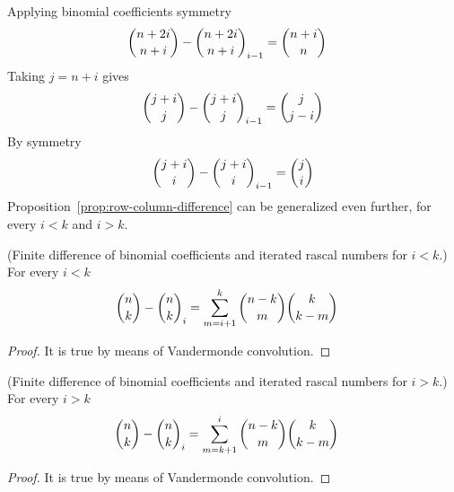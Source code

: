 Applying binomial coefficients symmetry
\begin{align*}
    \binom{n+2i}{n+i} - \binom{n+2i}{n+i}_{i-1} &= \binom{n+i}{n}
\end{align*}
Taking $j=n+i$ gives
\begin{align*}
    \binom{j+i}{j} - \binom{j+i}{j}_{i-1} = \binom{j}{j-i}
\end{align*}
By symmetry
\begin{align*}
    \binom{j+i}{i} - \binom{j+i}{i}_{i-1} = \binom{j}{i}
\end{align*}
Proposition~\eqref{prop:row-column-difference} can be generalized even further, for every $i<k$ and $i>k$.
\begin{proposition}
(Finite difference of binomial coefficients and iterated rascal numbers for $i<k$.)
    For every $i<k$
    \label{prop:row-column-difference-general}
    \begin{align*}
        \binom{n}{k} - \binom{n}{k}_{i} &= \sum_{m=i+1}^{k} \binom{n-k}{m} \binom{k}{k-m}
    \end{align*}
    \begin{proof}
        It is true by means of Vandermonde convolution.
    \end{proof}
\end{proposition}
\begin{proposition}
(Finite difference of binomial coefficients and iterated rascal numbers for $i>k$.)
    For every $i>k$
    \label{prop:row-column-difference-general-i-greater-k}
    \begin{align*}
        \binom{n}{k} - \binom{n}{k}_{i} &= \sum_{m=k+1}^{i} \binom{n-k}{m} \binom{k}{k-m}
    \end{align*}
    \begin{proof}
        It is true by means of Vandermonde convolution.
    \end{proof}
\end{proposition}
